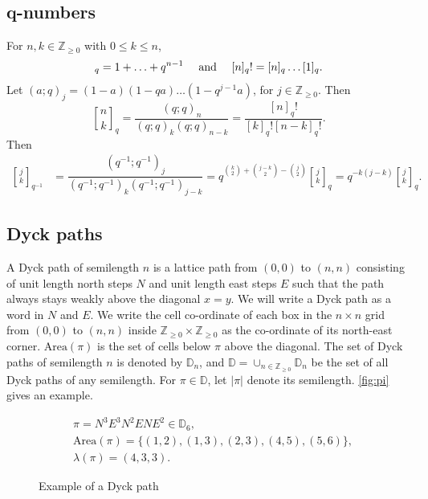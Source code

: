 \documentclass[12pt,reqno]{amsart}
\theoremstyle{plain}
\theoremstyle{definition}
\theoremstyle{remark}
\theoremstyle{example}
\numberwithin{equation}{section}
\newcommand\ZZ{\mathbb{Z}}
\newcommand{\Area}{\mathrm{Area}}
\newcommand{\DD}{\mathbb{D}}
\newcommand{\NEpath}[4]{
	\fill[white!25]  (#1) rectangle +(#2,#3);
	\fill[fill=white]
	(#1)
	\foreach \dir in {#4}{
		\ifnum\dir=0
		-- ++(1,0)
		\else
		-- ++(0,1)
		\fi
	} |- (#1);
	\draw[help lines] (#1) grid +(#2,#3);
	\draw[dashed] (#1) -- +(#3,#3);
	\foreach \x in {1,...,#2} {
		\node[below,gray] at ($(#1) + (\x-0.5, -0.3)$) {\x};
	}
	
	\foreach \y in {1,...,#3} {
		\node[left,gray] at ($(#1) + (-0.3, \y-0.5)$) {\y};
	}
	\coordinate (prev) at (#1);
	\foreach \dir in {#4}{
		\ifnum\dir=0
		\coordinate (dep) at (1,0);
		\else
		\coordinate (dep) at (0,1);
		\fi
		\draw[line width=2pt,-stealth] (prev) -- ++(dep) coordinate (prev);
	};
}
\begin{document}
\subsection{q-numbers} For $n,k \in \ZZ_{\geq 0}$ with $0 \leq k \leq n$, \begin{align*}
	[n]_q = 1+\ldots+q^{n-1}\quad \hbox{ and } \quad [n]_q! = [n]_q\ldots[1]_q.
\end{align*}
Let $(a;q)_j = (1-a)(1-qa)\ldots(1-q^{j-1}a)$, for $j \in \ZZ_{\geq 0}$. Then \begin{equation}\label{eq:qbindef}
	{n\brack k}_q = \dfrac{(q;q)_{n}}{(q;q)_k(q;q)_{n-k}} = \dfrac{[n]_q!}{[k]_q! [n-k]_q!}.
\end{equation} 
Then \begin{align}\label{eq:qbinomialreverse}
	{j \brack k}_{q^{-1}} &= \dfrac{(q^{-1};q^{-1})_j}{(q^{-1};q^{-1})_k (q^{-1};q^{-1})_{j-k}} 
	=q^{\binom{k}{2}+\binom{j-k}{2}-\binom{j}{2}} {j \brack k}_q = q^{-k(j-k)} {j \brack k}_q.
\end{align}


\subsection{Dyck paths} A Dyck path of semilength $n$ is a lattice path from $(0,0)$ to $(n,n)$ consisting of unit length north steps $N$ and unit length east steps $E$ such that the path always stays weakly above the diagonal $x=y$. We will write a Dyck path as a word in $N$ and $E$. We write the cell co-ordinate of each box in the $n\times n$ grid from $(0,0)$ to $(n,n)$ inside $\ZZ_{\geq 0} \times \ZZ_{\geq 0}$ as the co-ordinate of its north-east corner. $\Area(\pi)$ is the set of cells below $\pi$ above the diagonal. The set of Dyck paths of semilength $n$ is denoted by $\DD_n$, and $\DD = \cup_{n \in \ZZ_{\geq 0}} \DD_n$ be the set of all Dyck paths of any semilength. For $\pi \in \DD$, let $|\pi|$ denote its semilength. \autoref{fig:pi} gives an example.

\begin{figure}[h]
	\begin{minipage}{0.45 \textwidth}
	\end{minipage}
	\hfill
	\begin{minipage}{0.45 \textwidth}
		\begin{align*}
			&\pi = N^3E^3N^2ENE^2 \in \DD_6,
			\\
			&\Area(\pi) = \{(1,2),(1,3),(2,3),(4,5),(5,6)\},
			\\
			&\lambda(\pi) = (4,3,3). 	
		\end{align*}
	\end{minipage}
		\caption{Example of a Dyck path}
	\label{fig:pi}
\end{figure}
\end{document}
